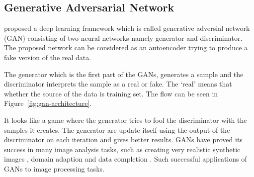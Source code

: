     \subsection{Generative Adversarial Network}

        \citet{goodfellow2014generative} proposed a deep learning framework which is called generative adversial network (GAN) consisting of two neural networks namely generator and discriminator.
        The proposed network can be considered as an autoencoder trying to produce a fake version of the real data.

        The generator which is the first part of the GANs, generates a sample and the discriminator interprets the sample as a real or fake.
        The ‘real’ means that whether the source of the data is training set. The flow can be seen in Figure~\ref{fig:gan-architecture}.

        

        It looks like a game where the generator tries to fool the discriminator with the samples it creates.
        The generator are update itself using the output of the discriminator on each iteration and gives better results.
        GANs have proved its success in many image analysis tasks, such as creating very realistic synthetic images \cite{shrivastava2017learning},
        domain adaption \cite{bousmalis2017unsupervised} and data completion \cite{yeh2017semantic}.
        Such successful applications of GANs to image processing tasks.
